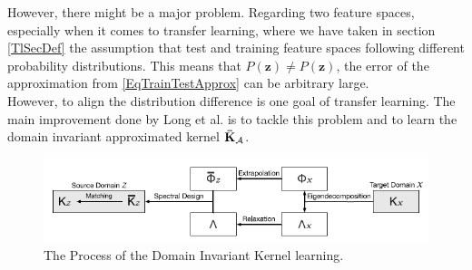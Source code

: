 However, there might be a major problem.
Regarding two feature spaces, especially when it comes to transfer learning, where we have taken in section \ref{TlSecDef} the assumption that test and training feature spaces following different probability distributions.
This means that $P(\mathbf{z})\neq P(\mathbf{z})$, the error of the approximation from \eqref{EqTrainTestApprox} can be arbitrary large.\cite{Long.2015}\\
However, to align the distribution difference is one goal of transfer learning.
The main improvement done by Long et al. is to tackle this problem and to learn the domain invariant approximated kernel $\mathbf{\bar{K}}_{\mathcal{A}}$.\cite{Long.2015}
\begin{figure}
	\centering
	\includegraphics[width=.8\linewidth]{figures/ProcessTKL.png}
	\caption[Tranfer Kernel Learning Process]{The Process of the Domain Invariant Kernel learning.\cite{Long.2015}}
	\label{FigTKLApp}
\end{figure}
